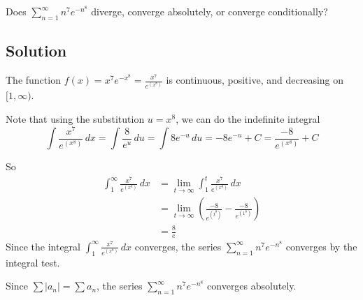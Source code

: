 \documentclass{article}
\begin{document}
\noindent
Does $\displaystyle \sum_{n=1}^\infty n^7e^{-n^8}$
diverge, converge absolutely, or converge conditionally?


\subsection*{Solution}

The function $f(x)=x^7e^{-x^8}=\frac{x^7}{e^{(x^8)}}$ is continuous, positive, and decreasing on $[1,\infty)$.

Note that using the substitution $u=x^8$, we can do the indefinite integral
\[ 
\int \frac{x^7}{e^{(x^8)}}\,dx 
= \int \frac{8}{e^u}\,du 
= \int 8e^{-u}\,du 
= -8e^{-u}+C = \frac{-8}{e^{(x^8)}}+C\]

So
\begin{align*}
\int_1^\infty \frac{x^7}{e^{(x^8)}}\,dx 
& = \lim_{t \to \infty} \int_1^t \frac{x^7}{e^{(x^8)}}\,dx \\
& = \lim_{t \to \infty} \left( \frac{-8}{e^{(t^8)}} - \frac{-8}{e^{(1^8)}}\right) \\
& = \frac{8}{e}
\end{align*}
Since the integral $\displaystyle \int_1^\infty \frac{x^7}{e^{(x^8)}}\,dx$ converges, the series $\displaystyle \sum_{n=1}^\infty n^7e^{-n^8}$ converges by the integral test.

Since $\sum |a_n| = \sum a_n$, the series $\displaystyle \sum_{n=1}^\infty n^7e^{-n^8}$ converges absolutely.
\end{document}
